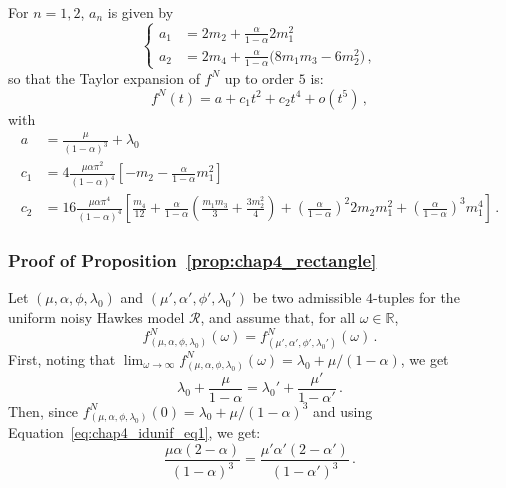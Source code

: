 \begin{subappendices}
\begin{remark}
For $n = 1, 2$, $a_n$ is given by
\[
\begin{cases}
    a_1 &= 2 m_2 + \frac{\alpha}{1 - \alpha} 2 m_1^2 \\
    a_2 &= 2 m_4 + \frac{\alpha}{1 - \alpha} \bigl(8 m_1 m_3 - 6 m_2^2\bigr) \,,
\end{cases}
\]
so that the Taylor expansion of $f^N$ up to order $5$ is:
\begin{equation*}
  f^N(t) = a + c_1 t^2 + c_2 t^4 + o(t^5) \,,
\end{equation*}
with
\begin{align*}
a &= \frac{\mu}{(1-\alpha)^3} + \lambda_0 \\
  c_1 &= 4 \frac{\mu\alpha \pi^2}{(1-\alpha)^4} \left[ - m_2 - \frac{\alpha}{1 - \alpha} m_1^2 \right]\\
  c_2 &= 16 \frac{\mu\alpha \pi^4}{(1-\alpha)^4} \left[ \frac{m_4}{12} + \frac{\alpha}{1 - \alpha} \left( \frac{m_1 m_3}{3} + \frac{3 m_2^2}{4} \right) + \left( \frac{\alpha}{1 - \alpha} \right)^2 2 m_2 m_1^2 + \left( \frac{\alpha}{1 - \alpha} \right)^3 m_1^4 \right] \,.
\end{align*}
\end{remark}

\subsubsection*{Proof of Proposition~\ref{prop:chap4_rectangle}}
Let $(\mu, \alpha, \phi, \lambda_0)$ and $(\mu', \alpha', \phi', \lambda_0')$ be two admissible $4$-tuples for the uniform noisy Hawkes model $\mathcal R$, and assume that, for all $\omega \in \mathbb R$,
\begin{equation*}
  f_{(\mu, \alpha, \phi, \lambda_0)}^N(\omega) = f_{(\mu', \alpha', \phi', \lambda_0')}^N(\omega)\,.
\end{equation*}
First, noting that $\lim_{\omega\to\infty} f_{(\mu, \alpha, \phi, \lambda_0)}^N(\omega) = \lambda_0 + \mu/(1 - \alpha)$, we get
\begin{equation}\label{eq:chap4_idunif_eq1}
  \lambda_0 + \frac{\mu}{1 - \alpha} = \lambda_0' + \frac{\mu'}{1 - \alpha'}\,.
\end{equation}
Then, since $f_{(\mu, \alpha, \phi, \lambda_0)}^N(0) = \lambda_0 + \mu/(1-\alpha)^3$ and using Equation~\eqref{eq:chap4_idunif_eq1}, we get:
\begin{equation}\label{eq:chap4_idunif_eq2}
  \frac{\mu\alpha(2-\alpha)}{(1-\alpha)^3} = \frac{\mu'\alpha'(2-\alpha')}{(1-\alpha')^3}\,.
\end{equation}


\end{subappendices}
